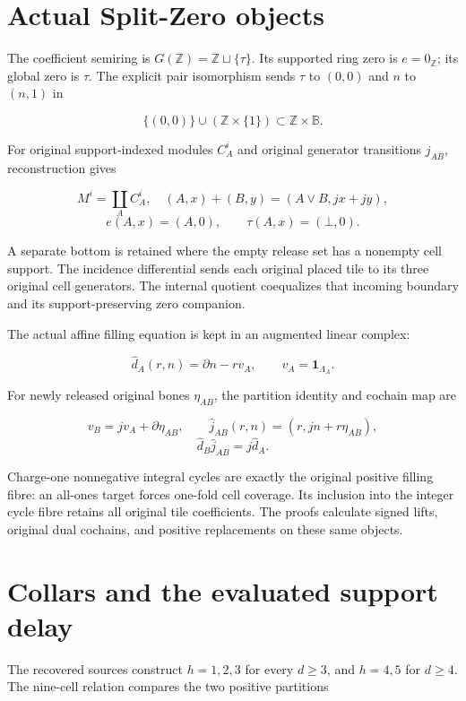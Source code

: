\documentclass[
  10pt,
]{scrreprt}
\begin{document}
\section{Actual Split-Zero objects}\label{actual-split-zero-objects}

The coefficient semiring is \(G(\mathbb Z)=\mathbb Z\sqcup\{\tau\}\).
Its supported ring zero is \(e=0_{\mathbb Z}\); its global zero is
\(\tau\). The explicit pair isomorphism sends \(\tau\) to \((0,0)\) and
\(n\) to \((n,1)\) in

\[\{(0,0)\}\cup(\mathbb Z\times\{1\})\subset\mathbb Z\times\mathbb B.\]

For original support-indexed modules \(C_A^i\) and original generator
transitions \(j_{AB}\), reconstruction gives

\[M^i=\coprod_A C_A^i,\quad (A,x)+(B,y)=(A\vee B,jx+jy),\]
\[e(A,x)=(A,0),\qquad\tau(A,x)=(\bot,0).\]

A separate bottom is retained where the empty release set has a nonempty
cell support. The incidence differential sends each original placed tile
to its three original cell generators. The internal quotient coequalizes
that incoming boundary and its support-preserving zero companion.

The actual affine filling equation is kept in an augmented linear
complex:

\[\widehat d_A(r,n)=\partial n-rv_A,\qquad v_A=\mathbf1_{\Lambda_A}.\]

For newly released original bones \(\eta_{AB}\), the partition identity
and cochain map are

\[v_B=jv_A+\partial\eta_{AB},\qquad
\widehat j_{AB}(r,n)=(r,jn+r\eta_{AB}),\]
\[\widehat d_B\widehat j_{AB}=j\widehat d_A.\]

Charge-one nonnegative integral cycles are exactly the original positive
filling fibre: an all-ones target forces one-fold cell coverage. Its
inclusion into the integer cycle fibre retains all original tile
coefficients. The proofs calculate signed lifts, original dual cochains,
and positive replacements on these same objects.

\section{Collars and the evaluated support
delay}\label{collars-and-the-evaluated-support-delay}

The recovered sources construct \(h=1,2,3\) for every \(d\ge3\), and
\(h=4,5\) for \(d\ge4\). The nine-cell relation compares the two
positive partitions
\end{document}
